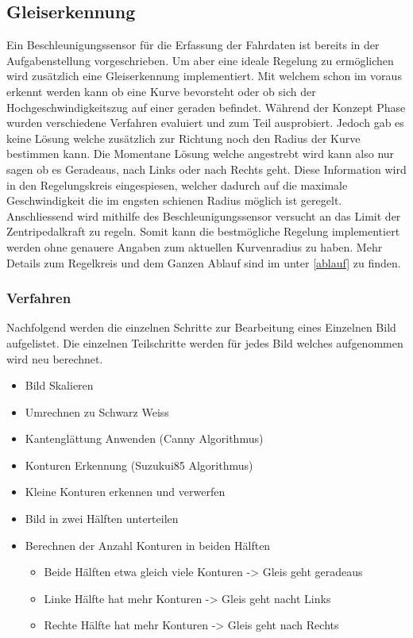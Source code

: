 \documentclass[../../main.tex]{subfiles}
\begin{document}
\subsection{Gleiserkennung}
Ein Beschleunigungssensor für die Erfassung der Fahrdaten ist bereits in der Aufgabenstellung vorgeschrieben.
Um aber eine ideale Regelung zu ermöglichen wird zusätzlich eine Gleiserkennung implementiert. Mit welchem schon im voraus
erkennt werden kann ob eine Kurve bevorsteht oder ob sich der Hochgeschwindigkeitszug auf einer geraden befindet.
Während der Konzept Phase wurden verschiedene Verfahren evaluiert und zum Teil ausprobiert. Jedoch gab es keine Lösung welche zusätzlich zur Richtung noch den Radius
der Kurve bestimmen kann. Die Momentane Lösung welche angestrebt wird kann also nur sagen ob es Geradeaus, nach Links oder nach Rechts geht.
Diese Information wird in den Regelungskreis eingespiesen, welcher dadurch auf die maximale Geschwindigkeit die im engsten schienen Radius möglich ist
geregelt. Anschliessend wird mithilfe des Beschleunigungssensor versucht an das Limit der Zentripedalkraft zu regeln. Somit kann die
bestmögliche Regelung implementiert werden ohne genauere Angaben zum aktuellen Kurvenradius zu haben.
Mehr Details zum Regelkreis und dem Ganzen Ablauf sind im unter \ref{ablauf} zu finden.

\subsubsection{Verfahren}
Nachfolgend werden die einzelnen Schritte zur Bearbeitung eines Einzelnen Bild aufgelistet.
Die einzelnen Teilschritte werden für jedes Bild welches aufgenommen wird neu berechnet.
\begin{itemize} %
    \item Bild Skalieren
    \item Umrechnen zu Schwarz Weiss
    \item Kantenglättung Anwenden (Canny Algorithmus)
    \item Konturen Erkennung (Suzukui85 Algorithmus)
    \item Kleine Konturen erkennen und verwerfen
    \item Bild in zwei Hälften unterteilen
    \item Berechnen der Anzahl Konturen in beiden Hälften
        \begin{itemize}
            \item Beide Hälften etwa gleich viele Konturen -> Gleis geht geradeaus
            \item Linke Hälfte hat mehr Konturen -> Gleis geht nacht Links
            \item Rechte Hälfte hat mehr Konturen -> Gleis geht nach Rechts
        \end{itemize}
\end{itemize}
\end{document}
